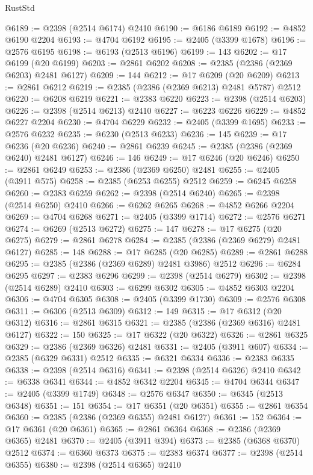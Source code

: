 \begin{lexlean}{RustStd}
\begin{coremodule}
@6189 := @2398 (@2514 @6174) @2410
@6190 := @6186 @6189
@6192 := @4852 @6190 @2204
@6193 := @4704 @6192
@6195 := @2405 (@3399 @1678)
@6196 := @2576 @6195
@6198 := @6193 (@2513 @6196)
@6199 := 143
@6202 := @17 @6199 (@20 @6199)
@6203 := @2861 @6202
@6208 := @2385 (@2386 (@2369 @6203) @2481 @6127)
@6209 := 144
@6212 := @17 @6209 (@20 @6209)
@6213 := @2861 @6212
@6219 := @2385 (@2386 (@2369 @6213) @2481 @5787) @2512
@6220 := @6208 @6219
@6221 := @2383 @6220
@6223 := @2398 (@2514 @6203)
@6226 := @2398 (@2514 @6213) @2410
@6227 := @6223 @6226
@6229 := @4852 @6227 @2204
@6230 := @4704 @6229
@6232 := @2405 (@3399 @1695)
@6233 := @2576 @6232
@6235 := @6230 (@2513 @6233)
@6236 := 145
@6239 := @17 @6236 (@20 @6236)
@6240 := @2861 @6239
@6245 := @2385 (@2386 (@2369 @6240) @2481 @6127)
@6246 := 146
@6249 := @17 @6246 (@20 @6246)
@6250 := @2861 @6249
@6253 := @2386 (@2369 @6250) @2481
@6255 := @2405 (@3911 @575)
@6258 := @2385 (@6253 @6255) @2512
@6259 := @6245 @6258
@6260 := @2383 @6259
@6262 := @2398 (@2514 @6240)
@6265 := @2398 (@2514 @6250) @2410
@6266 := @6262 @6265
@6268 := @4852 @6266 @2204
@6269 := @4704 @6268
@6271 := @2405 (@3399 @1714)
@6272 := @2576 @6271
@6274 := @6269 (@2513 @6272)
@6275 := 147
@6278 := @17 @6275 (@20 @6275)
@6279 := @2861 @6278
@6284 := @2385 (@2386 (@2369 @6279) @2481 @6127)
@6285 := 148
@6288 := @17 @6285 (@20 @6285)
@6289 := @2861 @6288
@6295 := @2385 (@2386 (@2369 @6289) @2481 @3986) @2512
@6296 := @6284 @6295
@6297 := @2383 @6296
@6299 := @2398 (@2514 @6279)
@6302 := @2398 (@2514 @6289) @2410
@6303 := @6299 @6302
@6305 := @4852 @6303 @2204
@6306 := @4704 @6305
@6308 := @2405 (@3399 @1730)
@6309 := @2576 @6308
@6311 := @6306 (@2513 @6309)
@6312 := 149
@6315 := @17 @6312 (@20 @6312)
@6316 := @2861 @6315
@6321 := @2385 (@2386 (@2369 @6316) @2481 @6127)
@6322 := 150
@6325 := @17 @6322 (@20 @6322)
@6326 := @2861 @6325
@6329 := @2386 (@2369 @6326) @2481
@6331 := @2405 (@3911 @607)
@6334 := @2385 (@6329 @6331) @2512
@6335 := @6321 @6334
@6336 := @2383 @6335
@6338 := @2398 (@2514 @6316)
@6341 := @2398 (@2514 @6326) @2410
@6342 := @6338 @6341
@6344 := @4852 @6342 @2204
@6345 := @4704 @6344
@6347 := @2405 (@3399 @1749)
@6348 := @2576 @6347
@6350 := @6345 (@2513 @6348)
@6351 := 151
@6354 := @17 @6351 (@20 @6351)
@6355 := @2861 @6354
@6360 := @2385 (@2386 (@2369 @6355) @2481 @6127)
@6361 := 152
@6364 := @17 @6361 (@20 @6361)
@6365 := @2861 @6364
@6368 := @2386 (@2369 @6365) @2481
@6370 := @2405 (@3911 @394)
@6373 := @2385 (@6368 @6370) @2512
@6374 := @6360 @6373
@6375 := @2383 @6374
@6377 := @2398 (@2514 @6355)
@6380 := @2398 (@2514 @6365) @2410

\end{coremodule}
\end{lexlean}
